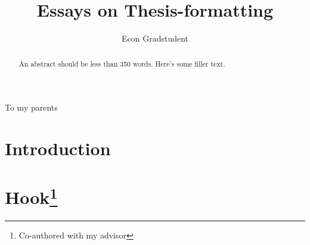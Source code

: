 \documentclass[11pt]{gsasthesis} %
\title{Essays on Thesis-formatting} %
\author{Econ Gradstudent} %
\begin{document}


\thesistitlepage
\copyrightpage
\begin{abstract}
  An abstract should be less than 350 words. Here's some filler text. \blindtext
\end{abstract}

\renewcommand{\contentsname}{\protect\centering\protect\Large Contents}
\renewcommand{\listtablename}{\protect\centering\protect\Large List of Tables}
\renewcommand{\listfigurename}{\protect\centering\protect\Large List of Figures}

\tableofcontents %

\listoftables
\listoffigures
\begin{acknowledgments}
  \blindtext
\end{acknowledgments}
\begin{dedication}
  To my parents
\end{dedication}



\chapter*{Introduction}\label{ch:intro}



\chapter{Hook\footnote{Co-authored with my advisor}}\label{ch:1}

\end{document}
